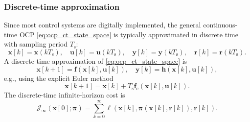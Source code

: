 \begin{frame}
	\frametitle{Discrete-time approximation}
	Since most control systems are digitally implemented, the general continuous-time OCP \eqref{eq:ocp_ct_state_space} is typically approximated in discrete time with sampling period $T_\mathrm{s}$:
	\begin{equation}
		\bm{x}[k]=\bm{x}(kT_\mathrm{s}),\quad
		\bm{u}[k]=\bm{u}(kT_\mathrm{s}),\quad
		\bm{y}[k]=\bm{y}(kT_\mathrm{s}),\quad
		\bm{r}[k]=\bm{r}(kT_\mathrm{s}).
		\label{eq:sampling_notation_ocp}
	\end{equation}\pause
	A discrete-time approximation of \eqref{eq:ocp_ct_state_space} is
	\begin{equation}
		\bm{x}[k+1]=\bm{f}(\bm{x}[k],\bm{u}[k]),\quad
		\bm{y}[k]=\bm{h}(\bm{x}[k],\bm{u}[k]),
		\label{eq:ocp_dt_system}
	\end{equation}\pause
	e.g., using the explicit Euler method
	\begin{equation}
		\bm{x}[k+1]=\bm{x}[k]
		+T_\mathrm{s}\bm{f}_\mathrm{c}(\bm{x}[k],\bm{u}[k]).
		\label{eq:ocp_euler_discretization}
	\end{equation}\pause
	The discrete-time infinite-horizon cost  is
	\begin{equation}
		\mathcal{J}_\infty(\bm{x}[0];\bm{\pi})=
		\sum_{k=0}^{\infty}
		\ell(\bm{x}[k],\bm{\pi}(\bm{x}[k],\bm{r}[k]),\bm{r}[k]).
		\label{eq:ocp_dt_cost}
	\end{equation}
\end{frame}

